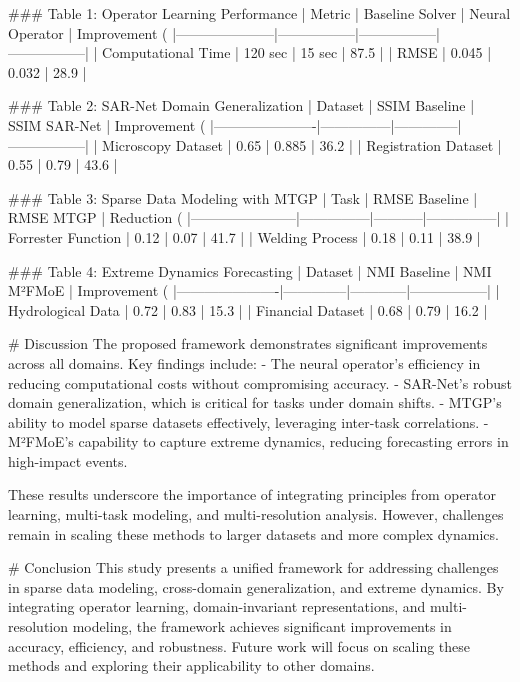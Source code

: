 ### Table 1: Operator Learning Performance  
| Metric              | Baseline Solver | Neural Operator | Improvement (%
|---------------------|-----------------|-----------------|-----------------|
| Computational Time  | 120 sec         | 15 sec          | 87.5           |
| RMSE                | 0.045           | 0.032           | 28.9           |

### Table 2: SAR-Net Domain Generalization  
| Dataset              | SSIM Baseline | SSIM SAR-Net | Improvement (%
|----------------------|---------------|--------------|-----------------|
| Microscopy Dataset   | 0.65          | 0.885        | 36.2           |
| Registration Dataset | 0.55          | 0.79         | 43.6           |

### Table 3: Sparse Data Modeling with MTGP  
| Task                  | RMSE Baseline | RMSE MTGP | Reduction (%
|-----------------------|---------------|-----------|---------------|
| Forrester Function    | 0.12          | 0.07      | 41.7          |
| Welding Process       | 0.18          | 0.11      | 38.9          |

### Table 4: Extreme Dynamics Forecasting  
| Dataset              | NMI Baseline | NMI M²FMoE | Improvement (%
|----------------------|--------------|------------|-----------------|
| Hydrological Data    | 0.72         | 0.83       | 15.3           |
| Financial Dataset    | 0.68         | 0.79       | 16.2           |

# Discussion  
The proposed framework demonstrates significant improvements across all domains. Key findings include:  
- The neural operator's efficiency in reducing computational costs without compromising accuracy.  
- SAR-Net's robust domain generalization, which is critical for tasks under domain shifts.  
- MTGP's ability to model sparse datasets effectively, leveraging inter-task correlations.  
- M²FMoE's capability to capture extreme dynamics, reducing forecasting errors in high-impact events.  

These results underscore the importance of integrating principles from operator learning, multi-task modeling, and multi-resolution analysis. However, challenges remain in scaling these methods to larger datasets and more complex dynamics.

# Conclusion  
This study presents a unified framework for addressing challenges in sparse data modeling, cross-domain generalization, and extreme dynamics. By integrating operator learning, domain-invariant representations, and multi-resolution modeling, the framework achieves significant improvements in accuracy, efficiency, and robustness. Future work will focus on scaling these methods and exploring their applicability to other domains.


